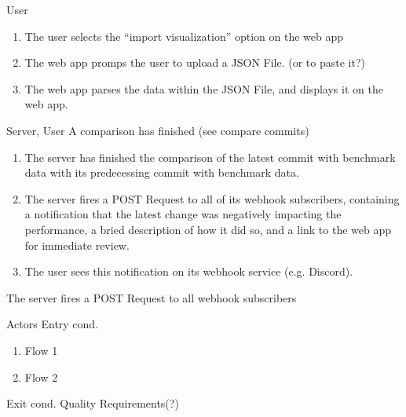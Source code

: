 \bigskip

{User}
{}
{\begin{enumerate}
    \item The user selects the \enquote{import visualization} option on the web app
    \item The web app promps the user to upload a JSON File. (or to paste it?)
    \item The web app parses the data within the JSON File, and displays it on the web app.
\end{enumerate}} 
{}
{}

\bigskip

{Server, User}
{A comparison has finished (see compare commits)}
{\begin{enumerate}
    \item The server has finished the comparison of the latest commit with benchmark data with its predecessing commit with benchmark data.
    \item The server fires a POST Request to all of its webhook subscribers, 
          containing a notification that the latest change was negatively impacting the performance, a bried description of how it did so,
          and a link to the web app for immediate review.
    \item The user sees this notification on its webhook service (e.g. Discord).
\end{enumerate}}
{The server fires a POST Request to all webhook subscribers}
{}

\bigskip

{Actors}
{Entry cond.}
{\begin{enumerate}
    \item Flow 1
    \item Flow 2
\end{enumerate}} 
{Exit cond.}
{Quality Requirements(?)}